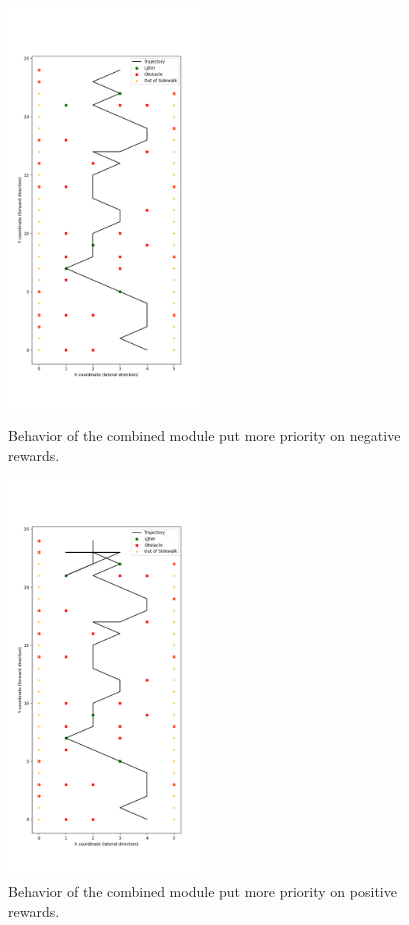 \documentclass[conference]{IEEEtran}
\begin{document}
\begin{figure}[!t]
	\centering
	\includegraphics[width=2in]{safe.png}	
	\caption{Behavior of the combined module put more priority on negative rewards.}
	\label{fig:safe}
	\includegraphics[width=2in]{greedy.png}	
	\caption{Behavior of the combined module put more priority on positive rewards.}
	\label{fig:greedy}
\end{figure}
\end{document}
